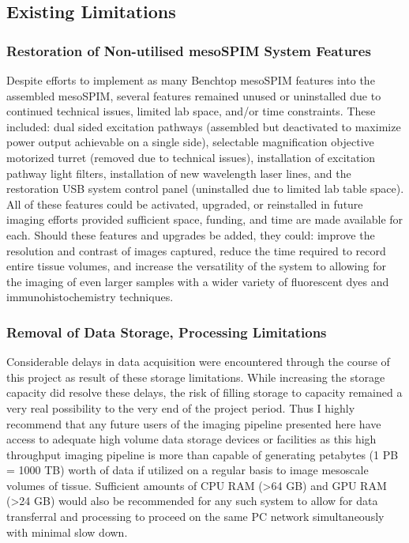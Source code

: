 \subsection{Existing Limitations}
\subsubsection{Restoration of Non-utilised mesoSPIM System Features}
Despite efforts to implement as many Benchtop mesoSPIM features into the assembled mesoSPIM, several features remained unused or uninstalled due to continued technical issues, limited lab space, and/or time constraints. These included: dual sided excitation pathways (assembled but deactivated to maximize power output achievable on a single side), selectable magnification objective motorized turret (removed due to technical issues), installation of excitation pathway light filters, installation of new wavelength laser lines, and the restoration USB system control panel (uninstalled due to limited lab table space). All of these features could be activated, upgraded, or reinstalled in future imaging efforts provided sufficient space, funding, and time are made available for each. Should these features and upgrades be added, they could: improve the resolution and contrast of images captured, reduce the time required to record entire tissue volumes, and increase the versatility of the system to allowing for the imaging of even larger samples with a wider variety of fluorescent dyes and immunohistochemistry techniques.

\subsubsection{Removal of Data Storage, Processing Limitations}
Considerable delays in data acquisition were encountered through the course of this project as result of these storage limitations. While increasing the storage capacity did resolve these delays, the risk of filling storage to capacity remained a very real possibility to the very end of the project period. Thus I highly recommend that any future users of the imaging pipeline presented here have access to adequate high volume data storage devices or facilities as this high throughput imaging pipeline is more than capable of generating petabytes (1 PB = 1000 TB) worth of data if utilized on a regular basis to image mesoscale volumes of tissue. Sufficient amounts of CPU RAM (>64 GB) and GPU RAM (>24 GB) would also be recommended for any such system to allow for data transferral and processing to proceed on the same PC network simultaneously with minimal slow down.


